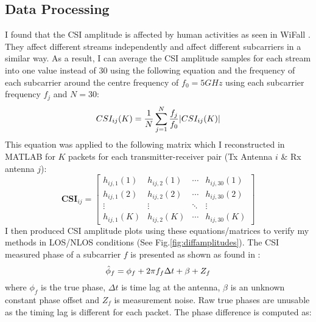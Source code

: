 \subsection{Data Processing}
I found that the CSI amplitude is affected by human activities as seen in WiFall \citep{WiFall}. They affect different streams independently and affect different subcarriers in a similar way. As a result, I can average the CSI amplitude samples for each stream into one value instead of 30 using the following equation and the frequency of each subcarrier around the centre frequency of $f_0 = 5GHz$ using each subcarrier frequency $f_j$ and $N=30$: 
\vspace{-11pt}
\begin{equation}\label{eqn:3.1}
    CSI_{ij}(K) = \frac{1}{N} \sum_{j=1}^{N} \frac{f_j}{f_0} |CSI_{ij}(K)|
    \vspace{-11pt}
\end{equation}
This equation was applied to the following matrix which I reconstructed in MATLAB for $K$ packets for each transmitter-receiver pair (Tx Antenna $i$ \& Rx antenna $j$):
\begin{equation}\label{eqn:3.2}
\textbf{CSI}_{ij}=\left[
\begin{array}{cccc}
    h_{ij,1}(1) & h_{ij,2}(1) & \cdots & h_{ij,30}(1) \\
    h_{ij,1}(2) & h_{ij,2}(2) & \cdots & h_{ij,30}(2) \\
   \vdots & \vdots & \ddots & \vdots \\
    h_{ij,1}(K) & h_{ij,2}(K) & \cdots & h_{ij,30}(K) 
\end{array}
\right]
\end{equation}
I then produced CSI amplitude plots using these equations/matrices to verify my methods in LOS/NLOS conditions (See Fig.\ref{fig:diffamplitudes}). The CSI measured phase of a subcarrier $f$ is presented as shown as found in \cite{MonaLisaSpotFi}:
\vspace{-11pt}
\begin{equation}\label{eqn:3.3}
    \hat{\phi}_f = \phi_{f}+2\pi f_{f}\Delta t + \beta + Z_f
    \vspace{-11pt}
\end{equation}
where $\phi_{f}$ is the true phase, $\Delta t$ is time lag at the antenna, $\beta$ is an unknown constant phase offset and $Z_f$ is measurement noise. Raw true phases are unusable as the timing lag is different for each packet. The phase difference is computed as:
\vspace{-11pt}
